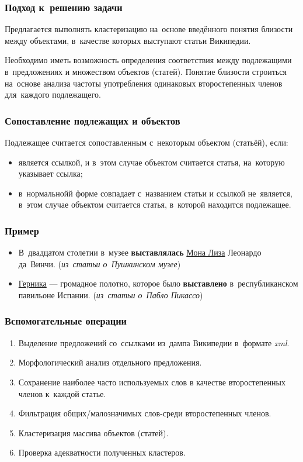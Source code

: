 \documentclass{beamer}
\begin{document}
\begin{frame}
\frametitle{Подход к~решению задачи}
Предлагается выполнять кластеризацию на~основе введённого понятия близости между объектами,
в~качестве которых выступают статьи Википедии.

\vspace{1cm} 

Необходимо иметь возможность определения соответствия между подлежащими в~предложениях
и множеством объектов (статей).
Понятие близости строиться на~основе анализа частоты употребления одинаковых второстепенных членов для~каждого подлежащего.
\end{frame}

\begin{frame}
\frametitle{Сопоставление подлежащих и объектов}

Подлежащее считается сопоставленным с~некоторым объектом (статьёй), если:

\begin{itemize}
\item {
является ссылкой,
и в~этом случае объектом считается статья, на~которую указывает ссылка;
}
\item {
в~нормальнойй форме совпадает с~названием статьи и ссылкой не~является,
в~этом случае объектом считается статья, в~которой находится подлежащее.
}
\end{itemize}
\end{frame}

\begin{frame}
\frametitle{Пример}
\begin{itemize}
\item {
В~двадцатом столетии в~музее {\bf выставлялась} \underline{Мона Лиза} Леонардо да~Винчи. 
({\it из~статьи о~Пушкинском музее})
}

\item {
\underline{Герника} --- громадное полотно, которое было {\bf выставлено} в~республиканском павильоне Испании. 
({\it из~статьи о~Пабло Пикассо})
}
\end{itemize}
\end{frame}

\begin{frame}
\frametitle{Вспомогательные операции}
\begin{enumerate}
\item {
Выделение предложений со~ссылками из~дампа Википедии в~формате {\it xml}.
}
\item {
Морфологический анализ отдельного предложения.
}
\item {
Сохранение наиболее часто используемых слов в качестве второстепенных членов к~каждой статье.
}
\item {
Фильтрация общих/малозначимых слов-среди второстепенных членов.
}
\item {
Кластеризация массива объектов (статей).
}
\item {
Проверка адекватности полученных кластеров.
}
\end{enumerate}
\end{frame}
\end{document}
